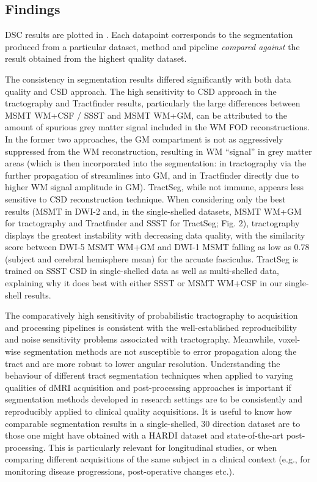 \subsection{Findings}

DSC results are plotted in .
Each datapoint corresponds to the segmentation produced from a particular dataset, method and pipeline \textit{compared against} the result obtained from the highest quality dataset.

The consistency in segmentation results differed significantly with both data quality and CSD approach.
The high sensitivity to CSD approach in the tractography and Tractfinder results, particularly the large differences between MSMT WM+CSF / SSST and MSMT WM+GM, can be attributed to the amount of spurious grey matter signal included in the WM FOD reconstructions.
In the former two approaches, the GM compartment is not as aggressively suppressed from the WM reconstruction, resulting in WM ``signal” in grey matter areas (which is then incorporated into the segmentation: in tractography via the further propagation of streamlines into GM, and in Tractfinder directly due to higher WM signal amplitude in GM).
TractSeg, while not immune, appears less sensitive to CSD reconstruction technique.
When considering only the best results (MSMT in DWI-2 and, in the single-shelled datasets, MSMT WM+GM for tractography and Tractfinder and SSST for TractSeg; Fig. 2), tractography displays the greatest instability with decreasing data quality, with the similarity score between DWI-5 MSMT WM+GM and DWI-1 MSMT falling as low as 0.78 (subject and cerebral hemisphere mean) for the arcuate fasciculus.
TractSeg is trained on SSST CSD in single-shelled data as well as multi-shelled data, explaining why it does best with either SSST or MSMT WM+CSF in our single-shell results.

The comparatively high sensitivity of probabilistic tractography to acquisition and processing pipelines is consistent with the well-established reproducibility and noise sensitivity problems associated with tractography.
Meanwhile, voxel-wise segmentation methods are not susceptible to error propagation along the tract and are more robust to lower angular resolution.
Understanding the behaviour of different tract segmentation techniques when applied to varying qualities of dMRI acquisition and post-processing approaches is important if segmentation methods developed in research settings are to be consistently and reproducibly applied to clinical quality acquisitions.
It is useful to know how comparable segmentation results in a single-shelled, 30 direction dataset are to those one might have obtained with a HARDI dataset and state-of-the-art post-processing.
This is particularly relevant for longitudinal studies, or when comparing different acquisitions of the same subject in a clinical context (e.g., for monitoring disease progressions, post-operative changes etc.).


